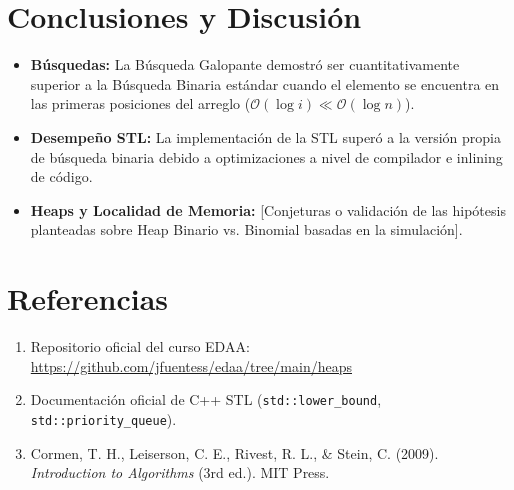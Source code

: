 \documentclass[11pt,a4paper]{article}
\begin{document}

\section{Conclusiones y Discusión}
\begin{itemize}
    \item \textbf{Búsquedas:} La Búsqueda Galopante demostró ser cuantitativamente superior a la Búsqueda Binaria estándar cuando el elemento se encuentra en las primeras posiciones del arreglo ($\mathcal{O}(\log i) \ll \mathcal{O}(\log n)$).
    \item \textbf{Desempeño STL:} La implementación de la STL superó a la versión propia de búsqueda binaria debido a optimizaciones a nivel de compilador e inlining de código.
    \item \textbf{Heaps y Localidad de Memoria:} [Conjeturas o validación de las hipótesis planteadas sobre Heap Binario vs. Binomial basadas en la simulación].
\end{itemize}

\section{Referencias}
\begin{enumerate}
    \item Repositorio oficial del curso EDAA: \url{https://github.com/jfuentess/edaa/tree/main/heaps}
    \item Documentación oficial de C++ STL (\texttt{std::lower\_bound}, \texttt{std::priority\_queue}).
    \item Cormen, T. H., Leiserson, C. E., Rivest, R. L., \& Stein, C. (2009). \emph{Introduction to Algorithms} (3rd ed.). MIT Press.
\end{enumerate}
\end{document}
